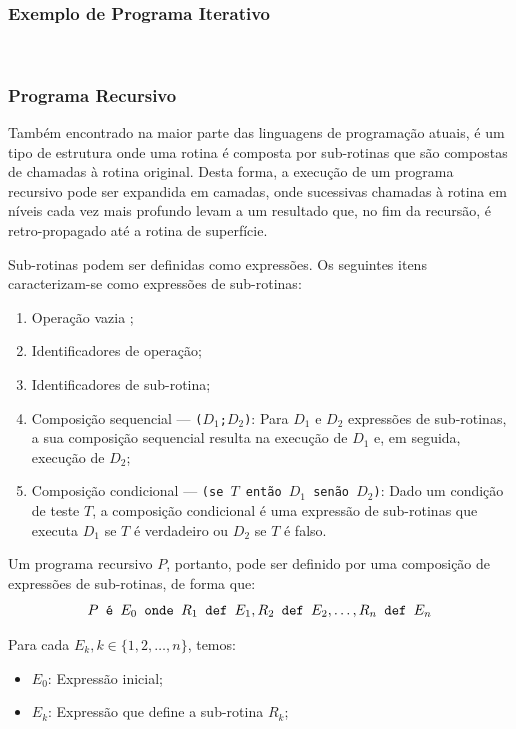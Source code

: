 \documentclass[12pt,fleqn]{article}
\begin{document}
\subsubsection{Exemplo de Programa Iterativo}
~ %



\subsubsection{Programa Recursivo}
Também encontrado na maior parte das linguagens de programação atuais, é um
tipo de estrutura onde uma rotina é composta por sub-rotinas que são compostas
de chamadas à rotina original. Desta forma, a execução de um programa recursivo
pode ser expandida em camadas, onde sucessivas chamadas à rotina em níveis cada
vez mais profundo levam a um resultado que, no fim da recursão, é
retro-propagado até a rotina de superfície.

Sub-rotinas podem ser definidas como expressões. Os seguintes itens
caracterizam-se como expressões de sub-rotinas:

\begin{enumerate}
    \item Operação vazia \checkmark;
    \item Identificadores de operação;
    \item Identificadores de sub-rotina;
    \item Composição sequencial --- \texttt{($D_1$;$D_2$)}: Para $D_1$ e $D_2$
    expressões de sub-rotinas, a sua composição sequencial resulta na execução
    de $D_1$ e, em seguida, execução de $D_2$;
    \item Composição condicional --- \texttt{(se $T$ então $D_1$ senão $D_2$)}:
    Dado um condição de teste $T$, a composição condicional é uma expressão de
    sub-rotinas que executa $D_1$ se $T$ é verdadeiro ou $D_2$ se $T$ é falso.
\end{enumerate}

Um programa recursivo $P$, portanto, pode ser definido por uma composição de
expressões de sub-rotinas, de forma que:
\[
    P \text{\tt\ é\ } E_0 \text{\tt\ onde\ } R_1 \text{\tt\ def\ } E_1, R_2
    \text{\tt\ def\ } E_2, \dots, R_n \text{\tt\ def\ } E_n
\]

Para cada $E_k, k \in \{1, 2, \dots, n\}$, temos:

\begin{itemize}
    \item $E_0$: Expressão inicial;
    \item $E_k$: Expressão que define a sub-rotina $R_k$;
\end{itemize}
\end{document}

